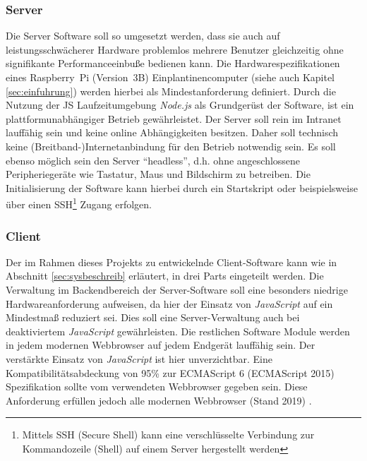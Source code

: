 \subsubsection{Server}\label{sec:servertech}
Die Server Software soll so umgesetzt werden, dass sie auch auf leistungsschwächerer Hardware problemlos mehrere Benutzer gleichzeitig ohne signifikante Performanceeinbuße bedienen kann. Die Hardwarespezifikationen eines Raspberry~Pi (Version~3B) Einplantinencomputer (siehe auch Kapitel \ref{sec:einfuhrung}) werden hierbei als Mindestanforderung definiert. Durch die Nutzung der JS Laufzeitumgebung \emph{Node.js} als Grundgerüst der Software, ist ein plattformunabhängiger Betrieb gewährleistet. Der Server soll rein im Intranet lauffähig sein und keine online Abhängigkeiten besitzen. Daher soll technisch keine (Breitband-)Internetanbindung für den Betrieb notwendig sein. Es soll ebenso möglich sein den Server "`headless"', d.h. ohne angeschlossene Peripheriegeräte wie Tastatur, Maus und Bildschirm zu betreiben. Die Initialisierung der Software kann hierbei durch ein Startskript oder beispielsweise über einen SSH\footnote{Mittels SSH (Secure Shell) kann eine verschlüsselte Verbindung zur Kommandozeile (Shell) auf einem Server hergestellt werden} Zugang erfolgen.
\subsubsection{Client}\label{sec:clienttech}
Der im Rahmen dieses Projekts zu entwickelnde Client-Software kann wie in Abschnitt \ref{sec:sysbeschreib} erläutert, in drei Parts eingeteilt werden. Die Verwaltung im Backendbereich der Server-Software soll eine besonders niedrige Hardwareanforderung aufweisen, da hier der Einsatz von \emph{JavaScript} auf ein Mindestmaß reduziert sei. Dies soll eine Server-Verwaltung auch bei deaktiviertem \emph{JavaScript} gewährleisten. Die restlichen Software Module werden in jedem modernen Webbrowser auf jedem Endgerät lauffähig sein. Der verstärkte Einsatz von \emph{JavaScript} ist hier unverzichtbar. Eine Kompatibilitätsabdeckung von 95\% zur ECMAScript 6 (ECMAScript 2015) Spezifikation sollte vom verwendeten Webbrowser gegeben sein. Diese Anforderung erfüllen jedoch alle modernen Webbrowser (Stand 2019) \cite{ECMAScri7:online}. 
